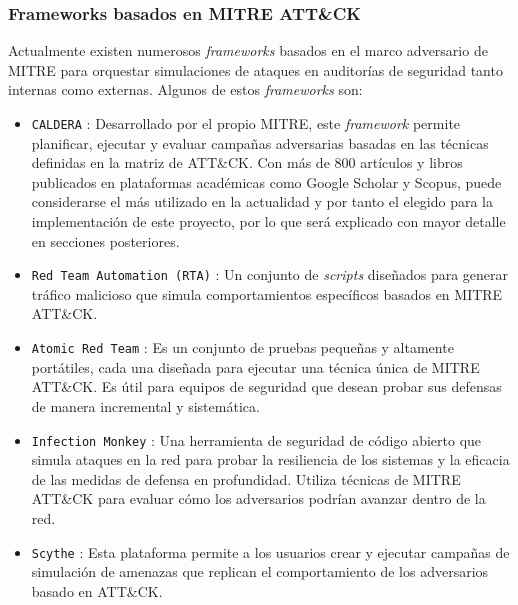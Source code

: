\subsubsection{Frameworks basados en MITRE \gls{ATT&CK}}

Actualmente existen numerosos \textit{frameworks} basados en el marco adversario de MITRE para orquestar simulaciones de ataques en auditorías de seguridad tanto internas como externas. Algunos de estos \textit{frameworks} son:

\begin{itemize}
    \label{frameworks-mitre}
    \item \texttt{\gls{CALDERA}} \cite{caldera}: Desarrollado por el propio MITRE, este \textit{framework} permite planificar, ejecutar y evaluar campañas adversarias basadas en las técnicas definidas en la matriz de \gls{ATT&CK}. Con más de 800 artículos y libros publicados en plataformas académicas como Google Scholar y Scopus, puede considerarse el más utilizado en la actualidad y por tanto el elegido para la implementación de este proyecto, por lo que será explicado con mayor detalle en secciones posteriores.
    \vspace{0.5mm}
    \item \texttt{Red Team Automation (\gls{RTA})} \cite{rta}: Un conjunto de \textit{scripts} diseñados para generar tráfico malicioso que simula comportamientos específicos basados en MITRE \gls{ATT&CK}.  
    \vspace{0.5mm}
    \item \texttt{Atomic Red Team} \cite{atomic_red_team}: Es un conjunto de pruebas pequeñas y altamente portátiles, cada una diseñada para ejecutar una técnica única de MITRE \gls{ATT&CK}. Es útil para equipos de seguridad que desean probar sus defensas de manera incremental y sistemática.
    \vspace{0.5mm}
    \item \texttt{Infection Monkey} \cite{infection_monkey}: Una herramienta de seguridad de código abierto que simula ataques en la red para probar la resiliencia de los sistemas y la eficacia de las medidas de defensa en profundidad. Utiliza técnicas de MITRE \gls{ATT&CK} para evaluar cómo los adversarios podrían avanzar dentro de la red.
    \vspace{0.5mm}
    \item \texttt{Scythe} \cite{scythe}: Esta plataforma permite a los usuarios crear y ejecutar campañas de simulación de amenazas que replican el comportamiento de los adversarios basado en \gls{ATT&CK}.
\end{itemize}

